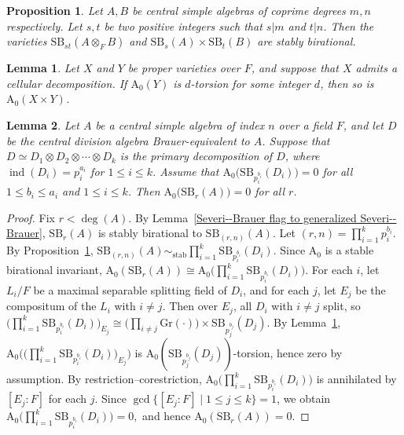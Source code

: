 \documentclass[10pt,a4paper]{amsart}
\newtheorem{lemma}{Lemma}
\newtheorem{proposition}{Proposition}
\begin{document}
\begin{proposition}\label{coprime degrees}
    Let \(A, B\) be central simple algebras of coprime degrees \(m,n\) respectively. Let \(s,t\) be two positive integers such that \(s|m\) and \(t |n\). Then the varieties \(\mathrm{SB}_{st}(A \otimes_F B)\) and \(\mathrm{SB}_s(A) \times \mathrm{SB}_t(B)\) are stably birational.
\end{proposition}

\begin{lemma}\label{cellular decomposition}
Let \(X\) and \(Y\) be proper varieties over \(F\), and suppose that \(X\) admits a cellular decomposition. If \(\mathrm{A_0}(Y)\) is \(d\)-torsion for some integer \(d\), then so is \(\mathrm{A_0}(X \times Y)\).
\end{lemma}

\begin{lemma}\label{reduction to index p CDA}
Let \(A\) be a central simple algebra of index \(n\) over a field \(F\), and let \(D\) be the central division algebra Brauer-equivalent to \(A\). Suppose that \(D \simeq D_1 \otimes D_2 \otimes \cdots \otimes D_k\) is the primary decomposition of \(D\), where \(\operatorname{ind}(D_i)=p_i^{a_i}\) for \(1 \le i \le k\). Assume that \(\mathrm{A_0}\big(\mathrm{SB}_{p_i^{b_i}}(D_i)\big)=0\) for all \(1 \le b_i \le a_i\) and \(1 \le i \le k\). Then \(\mathrm{A_0}\big(\mathrm{SB}_r(A)\big)=0\) for all \(r\).
\end{lemma}

\begin{proof}
Fix \(r < \deg(A)\). By Lemma~\ref{Severi--Brauer flag to generalized Severi--Brauer}, \(\mathrm{SB}_r(A)\) is stably birational to \(\mathrm{SB}_{(r,n)}(A)\). Let \((r,n)=\prod_{i=1}^k p_i^{b_i}\). By Proposition~\ref{coprime degrees}, \(\mathrm{SB}_{(r,n)}(A) \sim_{\mathrm{stab}} \prod_{i=1}^k \mathrm{SB}_{p_i^{b_i}}(D_i)\). Since \(\mathrm{A_0}\) is a stable birational invariant, 
\(
\mathrm{A_0}(\mathrm{SB}_r(A)) \cong \mathrm{A_0}\!\big(\prod_{i=1}^k \mathrm{SB}_{p_i^{b_i}}(D_i)\big)\). For each \(i\), let \(L_i/F\) be a maximal separable splitting field of \(D_i\), and for each \(j\), let \(E_j\) be the compositum of the \(L_i\) with \(i\neq j\). Then over \(E_j\), all \(D_i\) with \(i\neq j\) split, so 
\(
\big(\prod_{i=1}^k \mathrm{SB}_{p_i^{b_i}}(D_i)\big)_{E_j}
\cong
\big(\prod_{i\ne j} \mathrm{Gr}(\cdot)\big)\times \mathrm{SB}_{p_j^{b_j}}(D_j).
\)
By Lemma~\ref{cellular decomposition}, 
\(
\mathrm{A_0}\!\big(\big(\prod_{i=1}^k \mathrm{SB}_{p_i^{b_i}}(D_i)\big)_{E_j}\big)
\)
is \(\mathrm{A_0}(\mathrm{SB}_{p_j^{b_j}}(D_j))\)-torsion, hence zero by assumption. By restriction--corestriction, 
\(
\mathrm{A_0}\!\big(\prod_{i=1}^k \mathrm{SB}_{p_i^{b_i}}(D_i)\big)
\)
is annihilated by \([E_j:F]\) for each \(j\). Since \(\gcd\{[E_j:F]\mid 1\le j\le k\}=1\), we obtain 
\(
\mathrm{A_0}\!\big(\prod_{i=1}^k \mathrm{SB}_{p_i^{b_i}}(D_i)\big)=0,
\)
and hence \(\mathrm{A_0}(\mathrm{SB}_r(A))=0\).
\end{proof}
\end{document}
